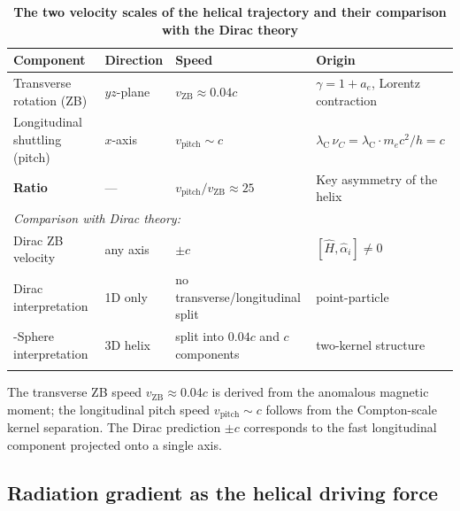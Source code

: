 \documentclass[%
 reprint, amsmath,amssymb, aps, prb, ]{revtex4-2}
\numberwithin{equation}{section}
\newcommand{\lambdaC}{\lambda_{\mathrm{C}}}
\begin{document}
\begin{table}[t!]
\centering
\caption{\textbf{The two velocity scales of the helical trajectory and their comparison with the Dirac theory}}
\label{tab:velocity_scales}
\renewcommand{\arraystretch}{1.4}
\begin{tabular}{p{5.0cm}p{2.0cm}p{5.2cm}p{4.8cm}}
\toprule
\textbf{Component} & \textbf{Direction} & \textbf{Speed} & \textbf{Origin} \\
\midrule
Transverse rotation (ZB)
& $yz$-plane
& $v_{\mathrm{ZB}} \approx 0.04c$
& $\gamma = 1 + a_e$, Lorentz contraction \cite{hanamura10} \\
\addlinespace[0.3cm]
Longitudinal shuttling (pitch)
& $x$-axis
& $v_{\mathrm{pitch}} \sim c$
& $\lambdaC\,\nu_C = \lambdaC \cdot m_ec^2/h = c$ \\
\addlinespace[0.3cm]
\textbf{Ratio}
& ---
& $v_{\mathrm{pitch}}/v_{\mathrm{ZB}} \approx 25$
& Key asymmetry of the helix \\
\midrule
\multicolumn{4}{l}{\textit{Comparison with Dirac theory:}} \\
\addlinespace[0.3cm]
Dirac ZB velocity
& any axis
& $\pm c$
& $[\hat{H}, \hat{\alpha}_i] \neq 0$ \\
\addlinespace[0.3cm]
Dirac interpretation
& 1D only
& no transverse/longitudinal split
& point-particle \\
\addlinespace[0.3cm]
0-Sphere interpretation
& 3D helix
& split into $0.04c$ and $c$ components
& two-kernel structure \\
\addlinespace[0.2cm]
\bottomrule
\end{tabular}
\vspace{0.2cm}
\begin{minipage}{0.95\textwidth}
\justifying\footnotesize
The transverse ZB speed $v_{\mathrm{ZB}} \approx 0.04c$ is derived from the anomalous magnetic moment; the longitudinal pitch speed $v_{\mathrm{pitch}} \sim c$ follows from the Compton-scale kernel separation. The Dirac prediction $\pm c$ corresponds to the fast longitudinal component projected onto a single axis.
\end{minipage}
\end{table}

\subsection{Radiation gradient as the helical driving force}
\label{subsec:gradient_drive}
\end{document}
